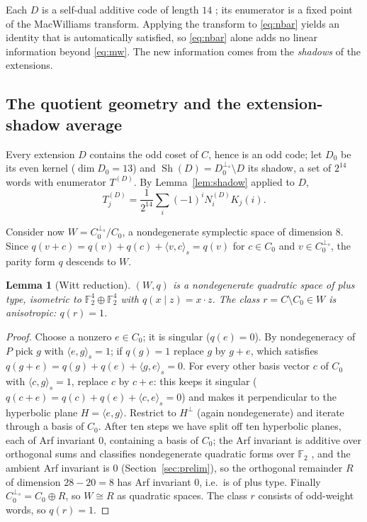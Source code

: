 \documentclass[11pt]{amsart}
\newtheorem{lemma}[theorem]{Lemma}
\theoremstyle{definition}
\theoremstyle{remark}
\DeclareMathOperator{\Sh}{Sh}
\newcommand{\F}{\mathbb{F}}
\newcommand{\perps}{{\perp_s}}
\newcommand{\sform}[2]{\langle #1,#2\rangle_s}
\begin{document}
Each $D$ is a self-dual additive code of length $14$
\cite{CRSS1998,NRS2006}; its enumerator is a fixed point of the
MacWilliams transform.  Applying the transform to
\eqref{eq:nbar} yields an identity that is automatically satisfied, so
\eqref{eq:nbar} alone adds no linear information beyond \eqref{eq:mw}.
The new information comes from the \emph{shadows} of the extensions.

\subsection{The quotient geometry and the extension-shadow average}

Every extension $D$ contains the odd coset of $C$, hence is an odd code;
let $D_0$ be its even kernel ($\dim D_0=13$) and
$\Sh(D)=D_0^{\perps}\setminus D$ its shadow, a set of $2^{14}$ words with
enumerator $T^{(D)}$.  By Lemma~\ref{lem:shadow} applied to $D$,
\begin{equation}\label{eq:tshadow}
T^{(D)}_j=\frac{1}{2^{14}}\sum_i(-1)^iN^{(D)}_iK_j(i).
\end{equation}

Consider now $W=C_0^{\perps}/C_0$, a nondegenerate symplectic space of
dimension $8$.  Since $q(v+c)=q(v)+q(c)+\sform{v}{c}=q(v)$ for $c\in C_0$
and $v\in C_0^{\perps}$, the parity form $q$ descends to $W$.

\begin{lemma}[Witt reduction]\label{lem:witt}
$(W,q)$ is a nondegenerate quadratic space of plus type, isometric to
$\F_2^4\oplus\F_2^4$ with $q(x\mid z)=x\cdot z$.  The class
$r=C\setminus C_0\in W$ is anisotropic: $q(r)=1$.
\end{lemma}

\begin{proof}
Choose a nonzero $e\in C_0$; it is singular ($q(e)=0$).  By nondegeneracy
of $P$ pick $g$ with $\sform{e}{g}=1$; if $q(g)=1$ replace $g$ by $g+e$,
which satisfies $q(g+e)=q(g)+q(e)+\sform{g}{e}=0$.  For every other basis
vector $c$ of $C_0$ with $\sform{c}{g}=1$, replace $c$ by $c+e$: this
keeps it singular ($q(c+e)=q(c)+q(e)+\sform{c}{e}=0$) and makes it
perpendicular to the hyperbolic plane $H=\langle e,g\rangle$.  Restrict to
$H^{\perp}$ (again nondegenerate) and iterate through a basis of $C_0$.
After ten steps we have split off ten hyperbolic planes, each of Arf
invariant $0$, containing a basis of $C_0$; the Arf invariant is additive
over orthogonal sums and classifies nondegenerate quadratic forms over
$\F_2$ \cite{Grove2002}, and the ambient Arf invariant is $0$
(Section~\ref{sec:prelim}), so the orthogonal remainder $R$ of dimension
$28-20=8$ has Arf invariant $0$, i.e.\ is of plus type.  Finally
$C_0^{\perps}=C_0\oplus R$, so $W\cong R$ as quadratic spaces.  The class
$r$ consists of odd-weight words, so $q(r)=1$.
\end{proof}
\end{document}
